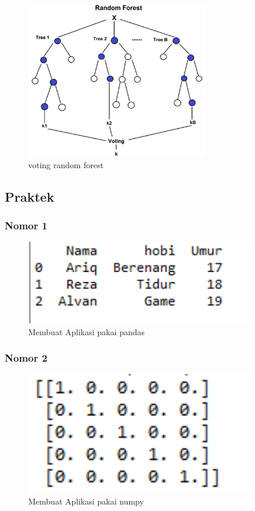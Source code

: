 \begin{figure}[H]
	\centering
	\includegraphics[width=8cm]{figures/1174077/3/4.png}
	\caption{voting random forest}
\end{figure}

\subsection{Praktek}
\subsubsection{Nomor 1}
\hfill\break

\begin{figure}[H]
\centerline{\includegraphics[width=10cm]{figures/1174077/3/5.png}}
\caption{Membuat Aplikasi pakai pandas}
\label{labelgambar}
\end{figure}

\subsubsection{Nomor 2}
\hfill\break

\begin{figure}[H]
\centerline{\includegraphics[width=10cm]{figures/1174077/3/6.png}}
\caption{Membuat Aplikasi pakai numpy}
\label{labelgambar}
\end{figure}

